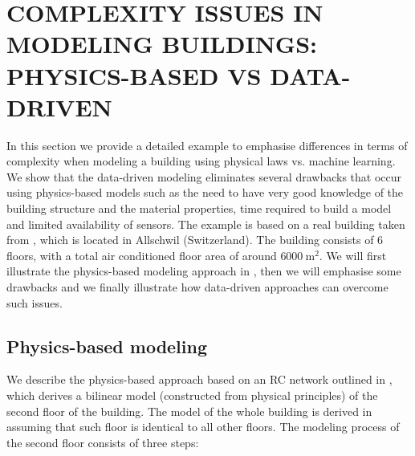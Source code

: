 



\section{COMPLEXITY ISSUES IN MODELING BUILDINGS: PHYSICS-BASED VS DATA-DRIVEN}\label{secModelingIssuesExample}
\textcolor[rgb]{0,0,1}{In this section we provide a detailed example to emphasise differences in terms of complexity when modeling a building using physical laws vs. machine learning. We show that the data-driven modeling eliminates several drawbacks that occur using physics-based models such as the need to have very good knowledge of the building structure and the material properties, time required to build a model and limited availability of sensors. The example is based on a real building taken from \cite{Sturzenegger2016}, which is located in Allschwil (Switzerland). The building consists of 6 floors, with a total air conditioned floor area of around $6000\ \mathrm{m^2}$. We will first illustrate the physics-based modeling approach in \cite{Sturzenegger2016}, then we will emphasise some drawbacks and we finally illustrate how data-driven approaches can overcome such issues.
}




\subsection{Physics-based modeling}
\label{SSS:physics-based}

\textcolor[rgb]{0,0,1}{We describe the physics-based approach based on an RC network outlined in \cite{Sturzenegger2016}, which derives a bilinear model (constructed from physical principles) of the second floor of the building. The model of the whole building is derived in \cite{Sturzenegger2016} assuming that such floor is identical to all other floors. The modeling process of the second floor consists of three steps:
}

